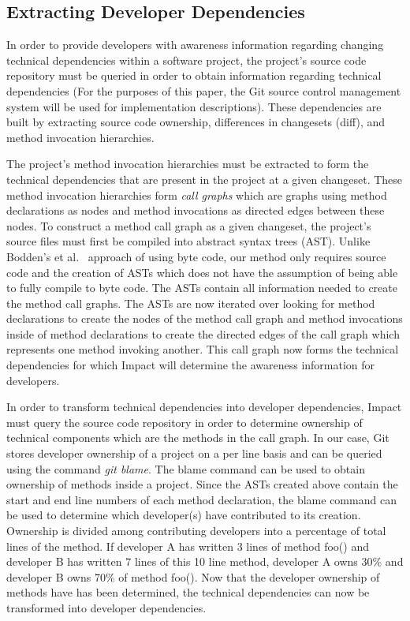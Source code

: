 \documentclass[conference]{IEEEtran}
\begin{document}
\subsection{Extracting Developer Dependencies}
In order to provide developers with awareness information regarding changing 
technical dependencies within a software project, the project's source code
repository must be queried in order to obtain information regarding technical
dependencies (For the purposes of this paper, the Git source control management
system will be used for implementation descriptions). 
These dependencies are built by extracting source code ownership,
differences in changesets (diff), and method invocation hierarchies.

The project's method invocation hierarchies must be extracted to form the 
technical dependencies that are present in the project at a given 
changeset. These method invocation hierarchies form \textit{call graphs} 
which are graphs using method declarations as
nodes and method invocations as directed edges between these nodes. To
construct a method call graph as a given changeset, the project's source
files must first be compiled into abstract syntax trees (AST). Unlike Bodden's
et al.~\cite{Bodden:2003:HVJ} approach of using byte code, our method only
requires source code and the creation of ASTs which does not have the
assumption of being able to fully compile to byte code. The ASTs contain
all information needed to create the method call graphs. The ASTs are now
iterated over looking for method declarations to create the nodes of the
method call graph and method invocations inside of method declarations
to create the directed edges of the call graph which represents one method
invoking another. This call graph now forms the technical dependencies for
which Impact will determine the awareness information for developers.

In order to transform technical dependencies into developer dependencies,
Impact must query the source code repository in order to determine ownership
of technical components which are the methods in the call graph. In our case,
Git stores developer ownership of a project on a per line basis and can be
queried using the command \textit{git blame}. The blame command can be used
to obtain ownership of methods inside a project. Since the ASTs created above
contain the start and end line numbers of each method declaration, the blame
command can be used to determine which developer(s) have contributed to
its creation. Ownership is divided among contributing developers into a 
percentage of total lines of the method. If developer A has written 3 lines
of method foo() and developer B has written 7 lines of this 10 line method,
developer A owns 30\% and developer B owns 70\% of method foo(). Now that
the developer ownership of methods have has been determined, the technical
dependencies can now be transformed into developer dependencies.
\end{document}
